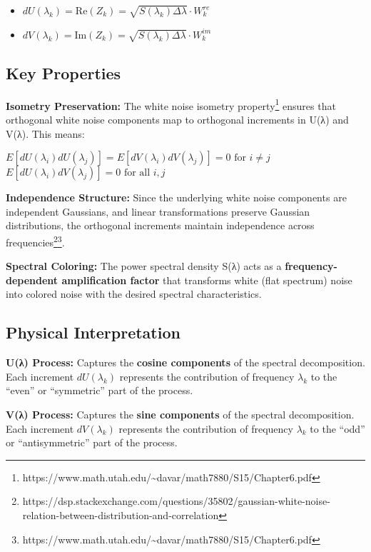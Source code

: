 \documentclass[
]{article}
\providecommand{\tightlist}{%
  \setlength{\itemsep}{0pt}\setlength{\parskip}{0pt}}
\begin{document}
\begin{itemize}
\tightlist
\item
  \(dU(\lambda_k) = \text{Re}(Z_k) = \sqrt{S(\lambda_k) \Delta\lambda} \cdot W_k^{re}\)
\item
  \(dV(\lambda_k) = \text{Im}(Z_k) = \sqrt{S(\lambda_k) \Delta\lambda} \cdot W_k^{im}\)
\end{itemize}

\subsection{Key Properties}\label{key-properties}

\textbf{Isometry Preservation:} The white noise isometry
property\footnote{https://www.math.utah.edu/\textasciitilde davar/math7880/S15/Chapter6.pdf}
ensures that orthogonal white noise components map to orthogonal
increments in U(λ) and V(λ). This means:

\(E[dU(\lambda_i) dU(\lambda_j)] = E[dV(\lambda_i) dV(\lambda_j)] = 0 \text{ for } i \neq j\)
\(E[dU(\lambda_i) dV(\lambda_j)] = 0 \text{ for all } i,j\)

\textbf{Independence Structure:} Since the underlying white noise
components are independent Gaussians, and linear transformations
preserve Gaussian distributions, the orthogonal increments maintain
independence across frequencies\footnote{https://dsp.stackexchange.com/questions/35802/gaussian-white-noise-relation-between-distribution-and-correlation}\footnote{https://www.math.utah.edu/\textasciitilde davar/math7880/S15/Chapter6.pdf}.

\textbf{Spectral Coloring:} The power spectral density S(λ) acts as a
\textbf{frequency-dependent amplification factor} that transforms white
(flat spectrum) noise into colored noise with the desired spectral
characteristics.

\subsection{Physical Interpretation}\label{physical-interpretation}

\textbf{U(λ) Process:} Captures the \textbf{cosine components} of the
spectral decomposition. Each increment \(dU(\lambda_k)\) represents the
contribution of frequency \(\lambda_k\) to the ``even'' or ``symmetric''
part of the process.

\textbf{V(λ) Process:} Captures the \textbf{sine components} of the
spectral decomposition. Each increment \(dV(\lambda_k)\) represents the
contribution of frequency \(\lambda_k\) to the ``odd'' or
``antisymmetric'' part of the process.
\end{document}
